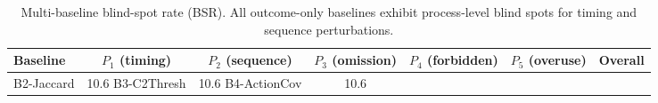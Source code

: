 \begin{table}[t]
\centering
\caption{Multi-baseline blind-spot rate (BSR). All outcome-only baselines exhibit process-level blind spots for timing and sequence perturbations.}
\label{tab:multi_bsr}
\small
\begin{tabular}{lcccccc}
\toprule
\textbf{Baseline} & \textbf{$P_1$ (timing)} & \textbf{$P_2$ (sequence)} & \textbf{$P_3$ (omission)} & \textbf{$P_4$ (forbidden)} & \textbf{$P_5$ (overuse)} & \textbf{Overall} \\
\midrule
B2-Jaccard & 10.6%
B3-C2Thresh & 10.6%
B4-ActionCov & 10.6%
\bottomrule
\end{tabular}
\end{table}